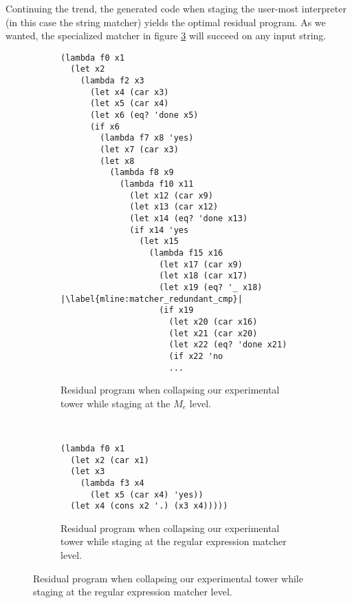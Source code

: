 \documentclass[a4paper,12pt,twoside,openright]{report}
\theoremstyle{definition}
\newcommand{\mevl}{$M_{e}$}
\begin{document}
Continuing the trend, the generated code when staging the user-most interpreter (in this case the string matcher) yields the optimal residual program. As we wanted, the specialized matcher in figure \ref{lst:mevl_regexp_staged} will succeed on any input string.

\begin{figure}[htp!]
\centering
    \begin{subfigure}{\linewidth}
        \centering
        \begin{verbatim}
(lambda f0 x1
  (let x2
    (lambda f2 x3
      (let x4 (car x3)
      (let x5 (car x4)
      (let x6 (eq? 'done x5)
      (if x6
        (lambda f7 x8 'yes)
        (let x7 (car x3)
        (let x8
          (lambda f8 x9
            (lambda f10 x11
              (let x12 (car x9)
              (let x13 (car x12)
              (let x14 (eq? 'done x13)
              (if x14 'yes
                (let x15
                  (lambda f15 x16
                    (let x17 (car x9)
                    (let x18 (car x17)
                    (let x19 (eq? '_ x18) |\label{mline:matcher_redundant_cmp}|
                    (if x19
                      (let x20 (car x16)
                      (let x21 (car x20)
                      (let x22 (eq? 'done x21)
                      (if x22 'no
                      ...
        \end{verbatim}
        \caption{Residual program when collapsing our experimental tower while staging at the \mevl{} level.}
        \label{lst:mevl_staged_regexp}
    \end{subfigure}
    \\[1ex]
    \par\bigskip
    \begin{subfigure}{\linewidth}
        \centering
        \begin{verbatim}
(lambda f0 x1
  (let x2 (car x1)
  (let x3
    (lambda f3 x4
      (let x5 (car x4) 'yes))
  (let x4 (cons x2 '.) (x3 x4)))))
        \end{verbatim}
        \caption{Residual program when collapsing our experimental tower while staging at the regular expression matcher level.}
        \label{lst:mevl_regexp_staged}
    \end{subfigure}
\end{figure}
\newpage
\end{document}
